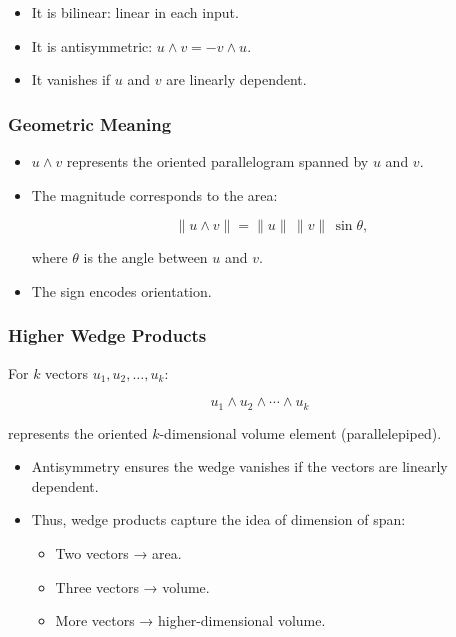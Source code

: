 \documentclass[
  letterpaper,
  DIV=11,
  numbers=noendperiod]{scrreprt}
\providecommand{\tightlist}{%
  \setlength{\itemsep}{0pt}\setlength{\parskip}{0pt}}
\begin{document}
\begin{itemize}
\tightlist
\item
  It is bilinear: linear in each input.
\item
  It is antisymmetric: \(u \wedge v = -v \wedge u\).
\item
  It vanishes if \(u\) and \(v\) are linearly dependent.
\end{itemize}

\subsubsection{Geometric Meaning}\label{geometric-meaning-1}

\begin{itemize}
\item
  \(u \wedge v\) represents the oriented parallelogram spanned by \(u\)
  and \(v\).
\item
  The magnitude corresponds to the area:

  \[
  \|u \wedge v\| = \|u\| \, \|v\| \, \sin\theta,
  \]

  where \(\theta\) is the angle between \(u\) and \(v\).
\item
  The sign encodes orientation.
\end{itemize}

\subsubsection{Higher Wedge Products}\label{higher-wedge-products}

For \(k\) vectors \(u_1, u_2, \dots, u_k\):

\[
u_1 \wedge u_2 \wedge \cdots \wedge u_k
\]

represents the oriented \(k\)-dimensional volume element
(parallelepiped).

\begin{itemize}
\item
  Antisymmetry ensures the wedge vanishes if the vectors are linearly
  dependent.
\item
  Thus, wedge products capture the idea of dimension of span:

  \begin{itemize}
  \tightlist
  \item
    Two vectors → area.
  \item
    Three vectors → volume.
  \item
    More vectors → higher-dimensional volume.
  \end{itemize}
\end{itemize}
\end{document}
